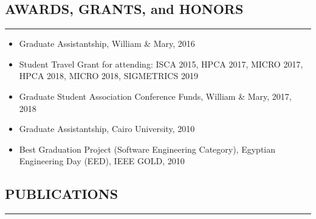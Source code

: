 \documentclass[10pt,a4]{article}
\begin{document}
\subsection*{AWARDS, GRANTS, and HONORS}
\hrule
\vspace{0.2cm}
\begin{itemize}
\item Graduate Assistantship, William \& Mary, 2016
\item Student Travel Grant for attending: ISCA 2015, HPCA 2017, MICRO 2017, HPCA 2018, MICRO 2018, SIGMETRICS 2019
\item Graduate Student Association Conference Funds, William \& Mary, 2017, 2018
\item Graduate Assistantship, Cairo University, 2010
\item Best Graduation Project (Software Engineering Category), Egyptian Engineering Day (EED), IEEE GOLD, 2010
\end{itemize}

\subsection*{PUBLICATIONS}
\hrule
\vspace{0.2cm}
 
\end{document}
